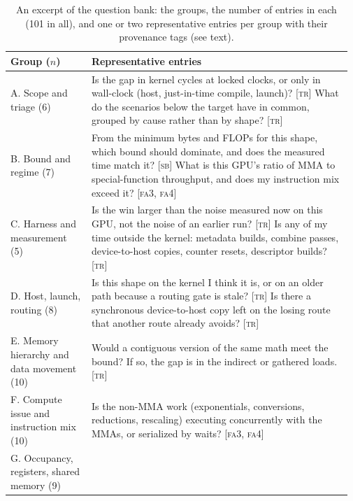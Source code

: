 \begin{table}[tbp]
\centering\small
\caption{An excerpt of the question bank: the groups, the number of entries in each (101 in all),
and one or two representative entries per group with their provenance tags (see text).}
\label{kernelseek:tab:qbank}
\setlength{\tabcolsep}{4pt}\footnotesize
\begin{tabular}{@{}>{\raggedright\arraybackslash}p{0.23\linewidth}>{\raggedright\arraybackslash}p{0.74\linewidth}@{}}
\toprule
Group ($n$) & Representative entries \\
\midrule
A. Scope and triage (6) &
Is the gap in kernel cycles at locked clocks, or only in wall-clock (host, just-in-time compile, launch)? [\textsc{tr}]
\newline What do the scenarios below the target have in common, grouped by cause rather than by shape? [\textsc{tr}] \\
\addlinespace
B. Bound and regime (7) &
From the minimum bytes and FLOPs for this shape, which bound should dominate, and does the measured time match it? [\textsc{sb}]
\newline What is this GPU's ratio of MMA to special-function throughput, and does my instruction mix exceed it? [\textsc{fa3}, \textsc{fa4}] \\
\addlinespace
C. Harness and measurement (5) &
Is the win larger than the noise measured now on this GPU, not the noise of an earlier run? [\textsc{tr}]
\newline Is any of my time outside the kernel: metadata builds, combine passes, device-to-host copies, counter resets, descriptor builds? [\textsc{tr}] \\
\addlinespace
D. Host, launch, routing (8) &
Is this shape on the kernel I think it is, or on an older path because a routing gate is stale? [\textsc{tr}]
\newline Is there a synchronous device-to-host copy left on the losing route that another route already avoids? [\textsc{tr}] \\
\addlinespace
E. Memory hierarchy and data movement (10) &
Would a contiguous version of the same math meet the bound? If so, the gap is in the indirect or gathered loads. [\textsc{tr}] \\
\addlinespace
F. Compute issue and instruction mix (10) &
Is the non-MMA work (exponentials, conversions, reductions, rescaling) executing concurrently with the MMAs, or serialized by waits? [\textsc{fa3}, \textsc{fa4}] \\
\addlinespace
G. Occupancy, registers, shared memory (9) &

\end{tabular}
\end{table}
